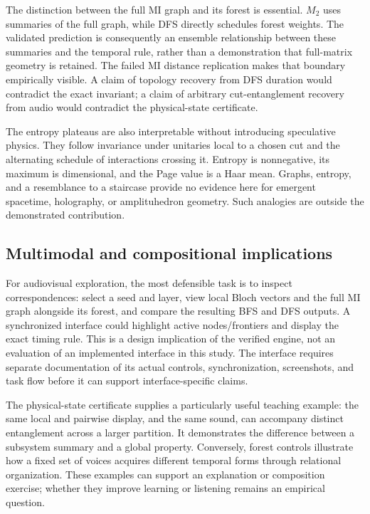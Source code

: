 \documentclass[pdflatex,iicol,sn-basic,Numbered]{sn-jnl}
\begin{document}
The distinction between the full MI graph and its forest is essential. $M_2$ uses summaries of the full graph, while DFS directly schedules forest weights. The validated prediction is consequently an ensemble relationship between these summaries and the temporal rule, rather than a demonstration that full-matrix geometry is retained. The failed MI distance replication makes that boundary empirically visible. A claim of topology recovery from DFS duration would contradict the exact invariant; a claim of arbitrary cut-entanglement recovery from audio would contradict the physical-state certificate.

The entropy plateaus are also interpretable without introducing speculative physics. They follow invariance under unitaries local to a chosen cut and the alternating schedule of interactions crossing it. Entropy is nonnegative, its maximum is dimensional, and the Page value is a Haar mean. Graphs, entropy, and a resemblance to a staircase provide no evidence here for emergent spacetime, holography, or amplituhedron geometry. Such analogies are outside the demonstrated contribution.

\subsection{Multimodal and compositional implications}
For audiovisual exploration, the most defensible task is to inspect correspondences: select a seed and layer, view local Bloch vectors and the full MI graph alongside its forest, and compare the resulting BFS and DFS outputs. A synchronized interface could highlight active nodes/frontiers and display the exact timing rule. This is a design implication of the verified engine, not an evaluation of an implemented interface in this study. The interface requires separate documentation of its actual controls, synchronization, screenshots, and task flow before it can support interface-specific claims.

The physical-state certificate supplies a particularly useful teaching example: the same local and pairwise display, and the same sound, can accompany distinct entanglement across a larger partition. It demonstrates the difference between a subsystem summary and a global property. Conversely, forest controls illustrate how a fixed set of voices acquires different temporal forms through relational organization. These examples can support an explanation or composition exercise; whether they improve learning or listening remains an empirical question.
\end{document}
